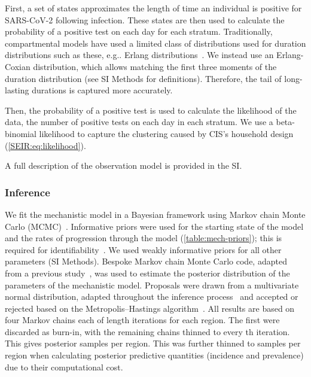 \documentclass[9pt,twocolumn,twoside]{pnas-new}
\makeatletter
\DeclareRobustCommand\onedot{\futurelet\@let@token\@onedot}
\def\@onedot{\ifx\@let@token.\else.\null\fi\xspace}
\def\eg{e.g\onedot} \def\Eg{{E.g}\onedot}
\makeatother
\begin{document}
{First, a set of states approximates the length of time an individual is positive for SARS-CoV-2 following infection.
These states are then used to calculate the probability of a positive test on each day for each stratum.
Traditionally, compartmental models have used a limited class of distributions used for duration distributions such as these, \eg Erlang distributions~\citep{hurtadoGLCT}.
We instead use an Erlang-Coxian distribution, which allows matching the first three moments of the duration distribution (see SI Methods for definitions).
Therefore, the tail of long-lasting durations is captured more accurately.

Then, the probability of a positive test is used to calculate the likelihood of the data, the number of positive tests on each day in each stratum.
We use a beta-binomial likelihood to capture the clustering caused by CIS's household design (\cref{SEIR:eq:likelihood}).

A full description of the observation model is provided in the SI.

\subsubsection*{Inference}
We fit the mechanistic model in a Bayesian framework using Markov chain Monte Carlo (MCMC)~\citep{hastingsMCMC,gelmanBDA}.
Informative priors were used for the starting state of the model and the rates of progression through the model (\cref{table:mech-priors}); this is required for identifiability~\citep{dankwaStructural}.
We used weakly informative priors for all other parameters (SI Methods).
Bespoke Markov chain Monte Carlo code, adapted from a previous study~\citep{ghoshApproximate}, was used to estimate the posterior distribution of the parameters of the mechanistic model.
Proposals were drawn from a multivariate normal distribution, adapted throughout the inference process~\citep{andrieuTutorial} and accepted or rejected based on the Metropolis--Hastings algorithm~\citep{hastingsMCMC}.
All results are based on four Markov chains each of length  iterations for each region.
The first  were discarded as burn-in, with the remaining chains thinned to every th iteration.
This gives  posterior samples per region.
This was further thinned to  samples per region when calculating posterior predictive quantities (incidence and prevalence) due to their computational cost.

}
\end{document}
